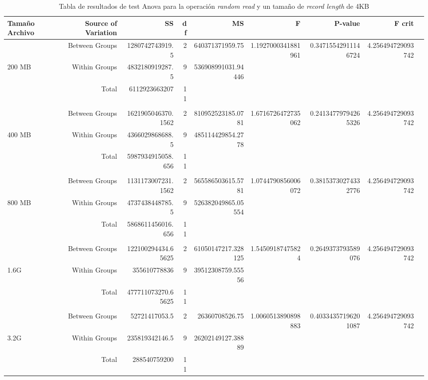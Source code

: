 \begin{landscape}
\begin{table}[!htp]\centering
\caption{Tabla de resultados de test Anova para la operación \textit{random read} y un tamaño de \textit{record length} de 4KB}\label{tab: }
\scriptsize
\begin{tabular}{lrrrrrrrr}\toprule
Tamaño Archivo &Source of Variation &SS &df &MS &F &P-value &F crit \\\midrule
&Between Groups &1280742743919.5 &2 &640371371959.75 &1.1927000341881961 &0.34715542911146724 &4.256494729093742 \\
200 MB &Within Groups &4832180919287.5 &9 &536908991031.94446 & & & \\
&Total &6112923663207 &11 & & & & \\
& & & & & & & \\
&Between Groups &1621905046370.1562 &2 &810952523185.0781 &1.6716726472735062 &0.24134779794265326 &4.256494729093742 \\
400 MB &Within Groups &4366029868688.5 &9 &485114429854.2778 & & & \\
&Total &5987934915058.656 &11 & & & & \\
& & & & & & & \\
&Between Groups &1131173007231.1562 &2 &565586503615.5781 &1.0744790856006072 &0.38153730274332776 &4.256494729093742 \\
800 MB &Within Groups &4737438448785.5 &9 &526382049865.05554 & & & \\
&Total &5868611456016.656 &11 & & & & \\
& & & & & & & \\
&Between Groups &122100294434.65625 &2 &61050147217.328125 &1.54509187475824 &0.2649373793589076 &4.256494729093742 \\
1.6G &Within Groups &355610778836 &9 &39512308759.55556 & & & \\
&Total &477711073270.65625 &11 & & & & \\
& & & & & & & \\
&Between Groups &52721417053.5 &2 &26360708526.75 &1.0060513890898883 &0.40334357196201087 &4.256494729093742 \\
3.2G &Within Groups &235819342146.5 &9 &26202149127.38889 & & & \\
&Total &288540759200 &11 & & & & \\
\bottomrule
\end{tabular}
\end{table}
\end{landscape}

